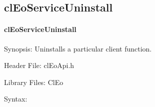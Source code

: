\begin{flushleft}
  \newpage
\subsection{clEoServiceUninstall}
\hypertarget{pageeo111}{}\paragraph{cl\-Eo\-Service\-Uninstall}\label{pageeo111}
\begin{Desc}
\item[Synopsis:]Uninstalls a particular client function.\end{Desc}
\begin{Desc}
\item[Header File:]clEoApi.h\end{Desc}
\begin{Desc}
\item[Library Files:]Cl\-Eo\end{Desc}
\begin{Desc}
\item[Syntax:]


\end{Desc}
\end{flushleft}
